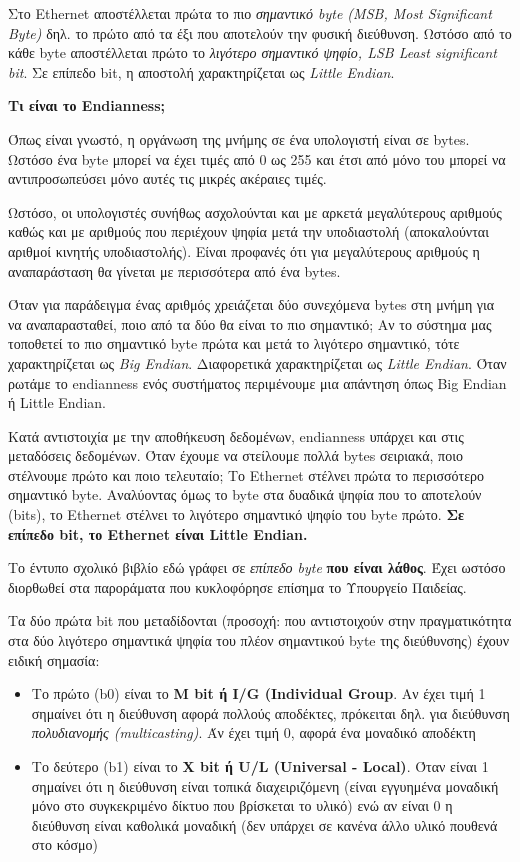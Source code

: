 Στο Ethernet αποστέλλεται πρώτα το πιο \emph{σημαντικό byte (MSB, Most Significant Byte)} δηλ. το πρώτο από τα έξι που αποτελούν την φυσική διεύθυνση. Ωστόσο από το κάθε byte αποστέλλεται πρώτο το \emph{λιγότερο σημαντικό ψηφίο, LSB Least significant bit}. Σε επίπεδο bit, η αποστολή χαρακτηρίζεται ως \emph{Little Endian}.

\begin{inthebox}
\textbf{Τι είναι το Endianness;}

Όπως είναι γνωστό, η οργάνωση της μνήμης σε ένα υπολογιστή είναι σε bytes. Ωστόσο ένα byte μπορεί να έχει τιμές από 0 ως 255 και έτσι από μόνο του μπορεί να αντιπροσωπεύσει μόνο αυτές τις μικρές ακέραιες τιμές.

Ωστόσο, οι υπολογιστές συνήθως ασχολούνται και με αρκετά μεγαλύτερους αριθμούς καθώς και με αριθμούς που περιέχουν ψηφία μετά την υποδιαστολή (αποκαλούνται αριθμοί κινητής υποδιαστολής). Είναι προφανές ότι για μεγαλύτερους αριθμούς η αναπαράσταση θα γίνεται με περισσότερα από ένα bytes.

Όταν για παράδειγμα ένας αριθμός χρειάζεται δύο συνεχόμενα bytes στη μνήμη για να αναπαρασταθεί, ποιο από τα δύο θα είναι το πιο σημαντικό; Αν το σύστημα μας τοποθετεί το πιο σημαντικό byte πρώτα και μετά το λιγότερο σημαντικό, τότε χαρακτηρίζεται ως \emph{Big Endian}. Διαφορετικά χαρακτηρίζεται ως \emph{Little Endian}. Όταν ρωτάμε το endianness ενός συστήματος περιμένουμε μια απάντηση όπως Big Endian ή Little Endian.

Κατά αντιστοιχία με την αποθήκευση δεδομένων, endianness υπάρχει και στις μεταδόσεις δεδομένων. Όταν έχουμε να στείλουμε πολλά bytes σειριακά, ποιο στέλνουμε πρώτο και ποιο τελευταίο; Tο Ethernet στέλνει πρώτα το περισσότερο σημαντικό byte. Αναλύοντας όμως το byte στα δυαδικά ψηφία που το αποτελούν (bits), το Ethernet στέλνει το λιγότερο σημαντικό ψηφίο του byte πρώτο. \textbf{Σε επίπεδο bit, το Ethernet είναι Little Endian.}

Το έντυπο σχολικό βιβλίο εδώ γράφει σε \emph{επίπεδο byte} \textbf{που είναι λάθος}. Έχει ωστόσο διορθωθεί στα παροράματα που κυκλοφόρησε επίσημα το Υπουργείο Παιδείας.\\
\end{inthebox}

Τα δύο πρώτα bit που μεταδίδονται (προσοχή: που αντιστοιχούν στην πραγματικότητα στα δύο λιγότερο σημαντικά ψηφία του πλέον σημαντικού byte της διεύθυνσης) έχουν ειδική σημασία:

\begin{itemize}
\item Το πρώτο (b0) είναι το \textbf{M bit ή I/G (Individual Group}. Αν έχει τιμή 1 σημαίνει ότι η διεύθυνση αφορά πολλούς αποδέκτες, πρόκειται δηλ. για διεύθυνση \emph{πολυδιανομής (multicasting)}. Άν έχει τιμή 0, αφορά ένα μοναδικό αποδέκτη
\item Το δεύτερο (b1) είναι το \textbf{X bit ή U/L (Universal - Local)}. Όταν είναι 1 σημαίνει ότι η διεύθυνση είναι τοπικά διαχειριζόμενη (είναι εγγυημένα μοναδική μόνο στο συγκεκριμένο δίκτυο που βρίσκεται το υλικό) ενώ αν είναι 0 η διεύθυνση είναι καθολικά μοναδική (δεν υπάρχει σε κανένα άλλο υλικό πουθενά στο κόσμο)
\end{itemize}

